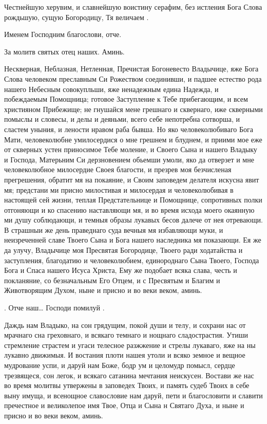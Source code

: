 \begin{mymulticols}
Честнейшую херувим, и славнейшую воистину серафим, без истления Бога Слова рождьшую, сущую Богородицу, Тя величаем .

Именем Господним благослови, отче.

За молитв святых отец наших. Аминь.





Нескверная, Неблазная, Нетленная, Пречистая Богоневесто Владычице, яже Бога Слова человеком преславным Си Рожеством соединивши, и падшее естество рода нашего Небесным совокупльши, яже ненадежным едина Надежда, и побеждаемым Помощница; готовое Заступление к Тебе прибегающим, и всем християном Прибежище; не гнушайся мене грешнаго и сквернаго, иже скверными помыслы и словесы, и делы и деяньми, всего себе непотребна сотворша, и сластем уныния, и лености нравом раба бывша. Но яко человеколюбиваго Бога Мати, человеколюбне умилосердися о мне грешнем и блуднем, и приими мое еже от скверных устен приносимое Тебе моление, и Своего Сына и нашего Владыку и Господа, Матерьним Си дерзновением обьемши умоли, яко да отверзет и мне человеколюбное милосердие Своея благости, и презрев моя безчисленая прегрешения, обратит мя на покаяние, и Своим заповедем делателя искусна явит мя; предстани ми присно милостивая и милосердая и человеколюбивая в настоящей сей жизни, теплая Предстательнице и Помощнице, сопротивных полки отгоняющи и ко спасению наставляющи мя, и во время исхода моего окаянную ми душу соблюдающи, и темныя образы лукавых бесов далече от нея отревающи. В страшныи же день праведнаго суда вечныя мя избавляющи муки, и неизреченней славе Твоего Сына и Бога нашего наследника мя показающи. Ея же да улучу, Владычице моя Пресвятая Богородице, Твоего ради ходатайства и заступления, благодатию и человеколюбием, единороднаго Сына Твоего, Господа Бога и Спаса нашего Исуса Христа, Ему же подобает всяка слава, честь и покланяние, со безначальным Его Отцем, и с Пресвятым и Благим и Животворящим Духом, ныне и присно и во веки веком, аминь.


 .  Отче наш…  Господи помилуй .


 Даждь нам Владыко, на сон грядущим, покой души и телу, и сохрани нас от мрачнаго сна греховнаго, и всякаго темнаго и нощнаго сладострастия. Утиши стремление страстем и угаси телесное разжжение и стрелы лукаваго, яже на ны лукавно движимыя. И востания плоти нашея утоли и всяко земное и вещное мудрование успи, и даруй нам Боже, бодр ум и целомудр помысл, сердце трезвящеся, сон легок, и всякаго сатанина мечтания неискусен. Востави же нас во время молитвы утвержены в заповедех Твоих, и память судеб Твоих в себе выну имуща, и всенощное славословие нам даруй, пети и благословити и славити пречестное и великолепое имя Твое, Отца и Сына н Святаго Духа, и ныне и присно и во веки веком, аминь.


\end{mymulticols}
